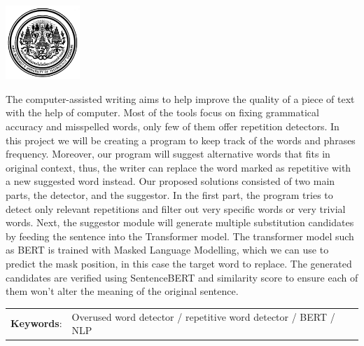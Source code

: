 \documentclass[12pt,oneside,openright,a4paper]{cpe-english-project}
\begin{document}
\pdfstringdefDisableCommands{%
\let\MakeUppercase\relax
}
\begin{center}
  \includegraphics[width=2.8cm]{logo02.jpg}
\end{center}
\vspace*{-1cm}

\maketitlepage
\makesignaturepage 

\abstract

The computer-assisted writing aims to help improve the quality of a piece of text with the help of computer. Most of the tools focus on fixing grammatical accuracy and misspelled words, only few of them offer repetition detectors. In this project we will be creating a program to keep track of the words and phrases frequency. Moreover, our program will suggest alternative words that fits in original context, thus, the writer can replace the word marked as repetitive with a new suggested word instead. Our proposed solutions consisted of two main parts, the detector, and the suggestor. In the first part, the program tries to detect only relevant repetitions and filter out very specific words or very trivial words. Next, the suggestor module will generate multiple substitution candidates by feeding the sentence into the Transformer model. The transformer model such as BERT is trained with Masked Language Modelling, which we can use to predict the mask position, in this case the target word to replace. The generated candidates are verified using SentenceBERT and similarity score to ensure each of them won’t alter the meaning of the original sentence. 

\begin{flushleft}
\begin{tabular*}{\textwidth}{@{}lp{}}
\textbf{Keywords}: & Overused word detector / repetitive word detector / BERT / NLP
\end{tabular*}
\end{flushleft}
\endabstract
\end{document}
